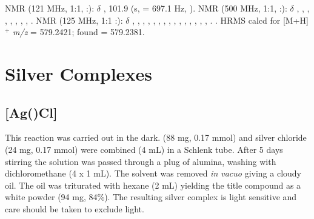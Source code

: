 \begin{sloppypar}
\phosphorus{} NMR (121 MHz, 1:1, :): $\delta$
,
101.9 (s, \JPSe{} = 697.1 Hz, ).
\proton{} NMR (500 MHz, 1:1, :): $\delta$
,
,
,
,
,
,
,
,
.
\carbon{} NMR (125 MHz, 1:1 :): $\delta$
,
,
,
,
,
,
,
,
,
,
,
,
,
,
,
.
.
HRMS calcd for  [M+H]$^+$ \emph{m/z} = 579.2421; found = 579.2381.
\end{sloppypar}

\section{Silver Complexes}
\label{section:experimental:silver}



\subsection*{[Ag(\tButhixantphos)Cl]}


This reaction was carried out in the dark.  \tBuThixantphos{} (88 mg, 0.17 mmol) and silver chloride (24 mg, 0.17 mmol) were combined  (4 mL) in a Schlenk tube.  After 5 days stirring the solution was passed through a plug of alumina, washing with dichloromethane (4 x 1 mL).  The solvent was removed \emph{in vacuo} giving a cloudy oil.  The oil was triturated with hexane (2 mL) yielding the title compound as a white powder (94 mg, 84\%).  The resulting silver complex is light sensitive and care should be taken to exclude light.

